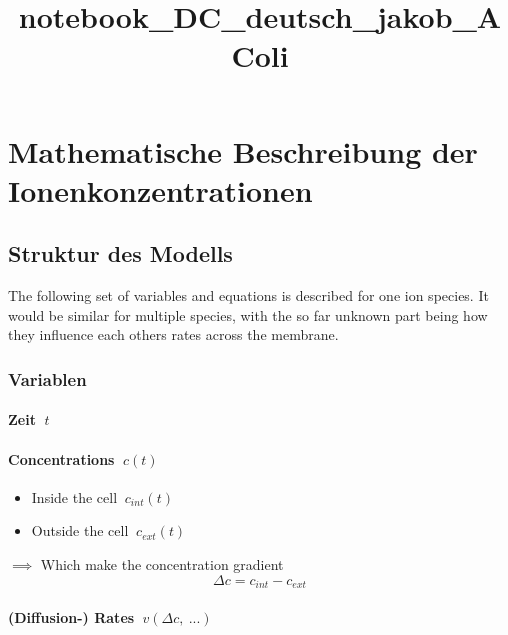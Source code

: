 \documentclass[11pt]{article}
\title{notebook\_DC\_deutsch\_jakob\_AColi}
\providecommand{\tightlist}{%
      \setlength{\itemsep}{0pt}\setlength{\parskip}{0pt}}
\begin{document}
    
    
    \maketitle
    
    

    
    \section{Mathematische Beschreibung der
Ionenkonzentrationen}\label{mathematische-beschreibung-der-ionenkonzentrationen}

\subsection{Struktur des Modells}\label{struktur-des-modells}

The following set of variables and equations is described for one ion
species. It would be similar for multiple species, with the so far
unknown part being how they influence each others rates across the
membrane.

    \subsubsection{Variablen}\label{variablen}

\paragraph{\texorpdfstring{Zeit
\(\:t\)}{Zeit \textbackslash{}:t}}\label{zeit-t}

\paragraph{\texorpdfstring{Concentrations
\(\:c(t)\)}{Concentrations \textbackslash{}:c(t)}}\label{concentrations-ct}

\begin{itemize}
\tightlist
\item
  Inside the cell \(\:c_{int}(t)\)
\item
  Outside the cell \(\:c_{ext}(t)\)
\end{itemize}

\(\implies\) Which make the concentration gradient
\[\varDelta c = c_{int} - c_{ext} \]

\paragraph{\texorpdfstring{(Diffusion-) Rates
\(\:v(\varDelta c,\:...)\)}{(Diffusion-) Rates \textbackslash{}:v(\textbackslash{}varDelta c,\textbackslash{}:...)}}\label{diffusion--rates-vvardelta-c...}
\end{document}
